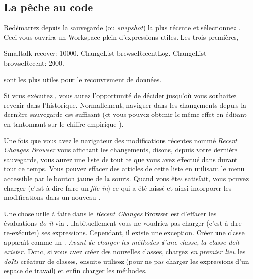 \documentclass[a4paper,10pt,twoside]{book}
\begin{document}
\subsection{La p\^eche au code}

Red\'emarrez \sq depuis la sauvegarde (ou \emph{snapshot}) la plus r\'ecente et
s\'electionnez . 
Ceci vous ouvrira un Workspace plein d'expressions utiles. Les trois premi\`eres,

\begin{code}{}
Smalltalk recover: 10000.
ChangeList browseRecentLog.
ChangeList browseRecent: 2000.
\end{code}

\noindent
sont les plus utiles pour le recouvrement de donn\'ees.

Si vous ex\'ecutez , vous aurez l'opportunit\'e
de d\'ecider jusqu'o\`u vous souhaitez revenir dans l'historique.
Normallement, naviguer dans les changements depuis la derni\`ere sauvegarde
est suffisant (et vous pouvez obtenir le m\^eme effet en \'editant 
 en tantonnant sur le chiffre empirique
).

Une fois que vous avez le navigateur des modifications r\'ecentes nomm\'e
\emph{Recent Changes Browser} vous affichant les changements, disons, depuis votre
derni\`ere sauvegarde, vous aurez une liste de tout ce que vous avez effectu\'e 
dans \sq durant tout ce temps.
Vous pouvez effacer des articles de cette liste en utilisant le menu accessible
par le {bouton jaune} de la souris. Quand vous \^etes satisfait, vous
pouvez charger (c'est-à-dire faire un \emph{file-in}) ce qui a \'et\'e laiss\'e
et ainsi incorporer les modifications dans un nouveau \changeset.

Une chose utile \`a faire dans le \emph{Recent Changes} Browser est
d'effacer les \'evaluations \emph{do it} via . 
Habituellement vous ne voudriez pas charger (c'est-à-dire re-ex\'ecuter) ses expressions.
Cependant, il existe une exception.
Cr\'eer une classe appara\^{\i}t comme un .
\emph{Avant de charger les m\'ethodes d'une classe, la classe doit exister.}
Donc, si vous avez cr\'eer des nouvelles classes, chargez \emph{en premier lieu} 
les \emph{doIts} cr\'eateur de classes, ensuite utilisez  
(pour ne pas charger les expressions d'un espace de travail)
et enfin charger les m\'ethodes.
\end{document}
